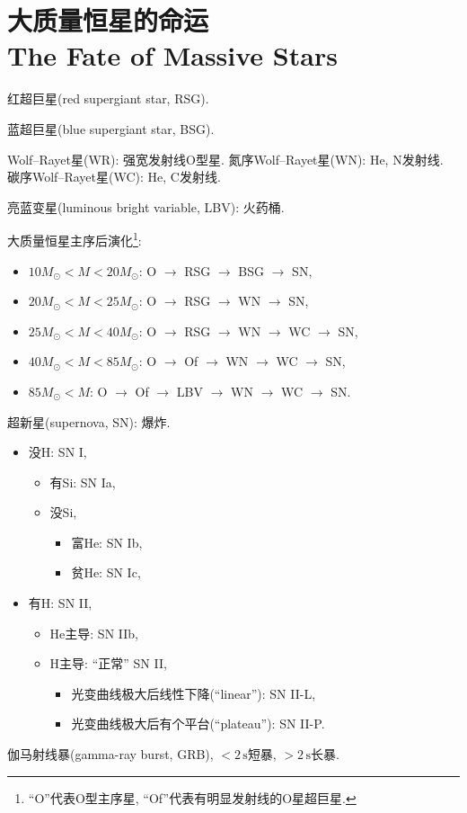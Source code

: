 \chapter{大质量恒星的命运\\The Fate of Massive Stars}

红超巨星(red supergiant star, RSG).

蓝超巨星(blue supergiant star, BSG).

Wolf--Rayet星(WR): 强宽发射线O型星. 氮序Wolf--Rayet星(WN): He, N发射线. 碳序Wolf--Rayet星(WC): He, C发射线.

亮蓝变星(luminous bright variable, LBV): 火药桶.

大质量恒星主序后演化\footnote{``O''代表O型主序星, ``Of''代表有明显发射线的O星超巨星.}:
\begin{itemize}
    \item $10M_\odot<M<20M_\odot$: O $\to$ RSG $\to$ BSG $\to$ SN,
    \item $20M_\odot<M<25M_\odot$: O $\to$ RSG $\to$ WN $\to$ SN,
    \item $25M_\odot<M<40M_\odot$: O $\to$ RSG $\to$ WN $\to$ WC $\to$ SN,
    \item $40M_\odot<M<85M_\odot$: O $\to$ Of $\to$ WN $\to$ WC $\to$ SN,
    \item $85M_\odot<M$: O $\to$ Of $\to$ LBV $\to$ WN $\to$ WC $\to$ SN.
\end{itemize}

超新星(supernova, SN): 爆炸.
\begin{itemize}
    \item 没H: SN I,
    \begin{itemize}
        \item 有Si: SN Ia,
        \item 没Si,
        \begin{itemize}
            \item 富He: SN Ib,
            \item 贫He: SN Ic,
        \end{itemize}
    \end{itemize}
    \item 有H: SN II,
    \begin{itemize}
        \item He主导: SN IIb,
        \item H主导: ``正常'' SN II,
        \begin{itemize}
            \item 光变曲线极大后线性下降(``linear''): SN II-L,
            \item 光变曲线极大后有个平台(``plateau''): SN II-P.
        \end{itemize}
    \end{itemize}
\end{itemize}

伽马射线暴(gamma-ray burst, GRB), $<2\,\text{s}$短暴, $>2\,\text{s}$长暴.
